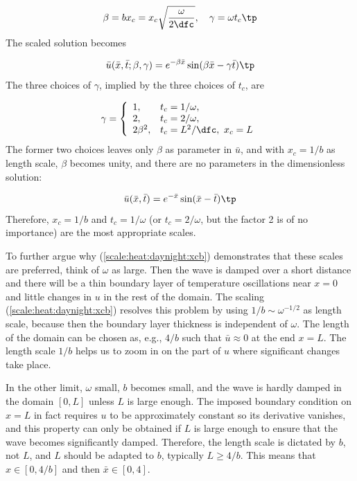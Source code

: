 \documentclass[graybox,envcountchap,sectrefs,final]{svmonodo}
\begin{document}
\[ \beta = bx_c = x_c\sqrt{\frac{\omega}{2\dfc}},\quad
\gamma = \omega t_c\tp\]
The scaled solution becomes

\[ \bar u(\bar x, \bar t; \beta,\gamma) = e^{-\beta\bar x}\sin(\beta\bar x - \gamma\bar t)\tp\]
The three choices of $\gamma$, implied by the three choices of $t_c$, are

\begin{equation}
\gamma = \left\lbrace\begin{array}{ll}
1, & t_c=1/\omega,\\ 
2, & t_c = 2/\omega,\\ 
2\beta^2, & t_c = L^2/\dfc,\ x_c=L
\end{array}\right.
\label{scale:heat:daynight:gamma3}
\end{equation}
The former two choices leaves only $\beta$ as parameter in $\bar u$,
and with $x_c=1/b$ as length scale, $\beta$ becomes unity, and there
are no parameters in the dimensionless solution:

\begin{equation}
\bar u(\bar x, \bar t) = e^{-\bar x}\sin(\bar x - \bar t)\tp
\label{scale:heat:daynight:xcb}
\end{equation}
Therefore, $x_c=1/b$ and $t_c=1/\omega$ (or $t_c=2/\omega$, but the
factor 2 is of no importance) are the most appropriate scales.

To further argue why (\ref{scale:heat:daynight:xcb}) demonstrates
that these scales are
preferred, think of
$\omega$ as large. Then the wave is damped over a short
distance and there will be a thin boundary layer of temperature
oscillations near $x=0$ and little changes in $u$ in the rest of
the domain. The scaling (\ref{scale:heat:daynight:xcb}) resolves
this problem by using $1/b \sim \omega^{-1/2}$ as length scale,
because then the boundary layer thickness is independent of
$\omega$. The length of the domain can be chosen as, e.g., $4/b$
such that $\bar u\approx 0$ at the end $x=L$. The length scale $1/b$
helps us to zoom in on the part of $u$ where significant changes
take place.

In the other limit, $\omega$ small, $b$ becomes small, and the wave is
hardly damped in the domain $[0,L]$ unless $L$ is large enough.  The
imposed boundary condition on $x=L$ in fact requires $u$ to be
approximately constant so its derivative vanishes, and this property
can only be obtained if $L$ is large enough to ensure that the wave
becomes significantly damped.  Therefore, the length scale is dictated
by $b$, not $L$, and $L$ should be adapted to $b$, typically $L\geq
4/b$. This means that $x\in [0,4/b]$ and then $\bar x\in [0,4]$.
\end{document}
